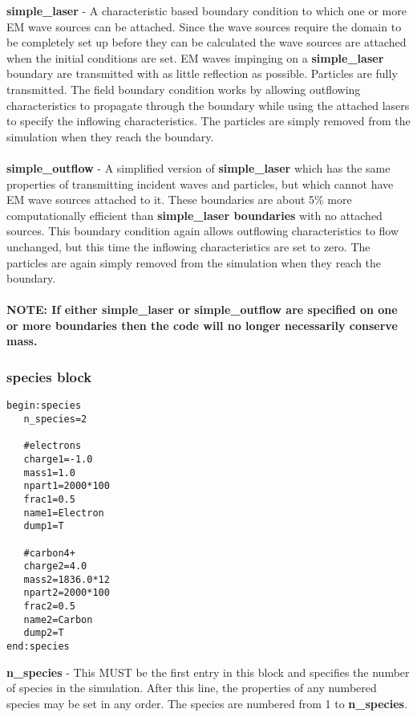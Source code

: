 \documentclass[12pt]{article}
\newcommand{\emphtext}{\color{warwickdark} \fontfamily{phv}\selectfont\Large\bf}
\newcommand{\boxverbatim}[1]{\begin{Verbatim}[obeytabs=true,frame=single,
  framerule=0.5mm,rulecolor=\color{warwickmid},label=#1]}
\newcommand{\inlineemph}[1]{{\color{warwicklight} \bf{#1}}}
\begin{document}
{\emphtext simple\_laser} - A characteristic based boundary condition to which
one or more EM wave sources can be attached. Since the wave sources require the
domain to be completely set up before they can be calculated the wave sources
are attached when the initial conditions are set.  EM waves impinging on a
\inlineemph{simple\_laser} boundary are transmitted with as little reflection
as possible. Particles are fully transmitted. The field boundary condition
works by allowing outflowing characteristics to propagate through the boundary
while using the attached lasers to specify the inflowing characteristics. The
particles are simply removed from the simulation when they reach the
boundary.\\\\

{\emphtext simple\_outflow} - A simplified version of \inlineemph{simple\_laser}
which has the same properties of transmitting incident waves and
particles, but which cannot have EM wave sources attached to it. These
boundaries are about 5\% more computationally efficient than
\inlineemph{simple\_laser boundaries} with no attached sources. This boundary
condition again allows outflowing characteristics to flow unchanged, but this
time the inflowing characteristics are set to zero. The particles are again
simply removed from the simulation when they reach the boundary.\\\\

{\emphtext NOTE: If either simple\_laser or simple\_outflow are specified on
one or more boundaries then the code will no longer necessarily conserve mass.}

\subsubsection{\inlineemph{species} block}

\boxverbatim{species block}
begin:species
   n_species=2

   #electrons
   charge1=-1.0
   mass1=1.0
   npart1=2000*100
   frac1=0.5
   name1=Electron
   dump1=T

   #carbon4+
   charge2=4.0
   mass2=1836.0*12
   npart2=2000*100
   frac2=0.5
   name2=Carbon
   dump2=T
end:species
\end{Verbatim}

{\emphtext n\_species} - This MUST be the first entry in this block and
specifies the number of species in the simulation. After this line, the
properties of any numbered species may be set in any order. The species are
numbered from 1 to \inlineemph{n\_species}.\\
\end{document}
